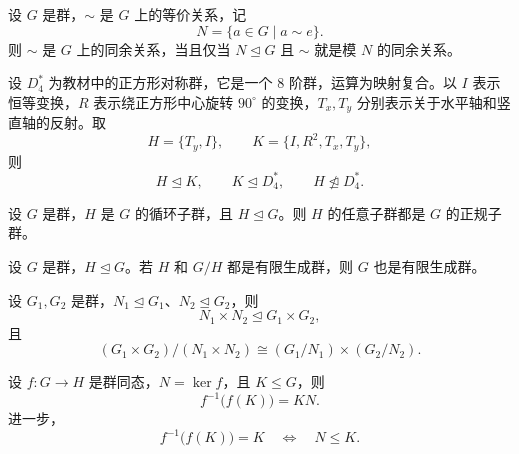 \begin{proposition}\label{prop:congruence-identity-class}
设 $G$ 是群，$\sim$ 是 $G$ 上的等价关系，记
\[
  N=\{a\in G\mid a\sim e\}.
\]
则 $\sim$ 是 $G$ 上的同余关系，当且仅当 $N\trianglelefteq G$ 且 $\sim$ 就是模 $N$ 的同余关系。
\end{proposition}

\begin{example}\label{ex:normality-not-transitive}
设 $D_4^*$ 为教材中的正方形对称群，它是一个 $8$ 阶群，运算为映射复合。以 $I$ 表示恒等变换，$R$ 表示绕正方形中心旋转 $90^\circ$ 的变换，$T_x,T_y$ 分别表示关于水平轴和竖直轴的反射。取
\[
  H=\{T_y,I\},\qquad K=\{I,R^2,T_x,T_y\},
\]
则
\[
  H\trianglelefteq K,\qquad K\trianglelefteq D_4^*,
  \qquad H\not\trianglelefteq D_4^*.
\]
\end{example}

\begin{proposition}\label{prop:subgroups-of-cyclic-normal}
设 $G$ 是群，$H$ 是 $G$ 的循环子群，且 $H\trianglelefteq G$。则 $H$ 的任意子群都是 $G$ 的正规子群。
\end{proposition}

\begin{theorem}\label{thm:finitely-generated-extension}
设 $G$ 是群，$H\trianglelefteq G$。若 $H$ 和 $G/H$ 都是有限生成群，则 $G$ 也是有限生成群。
\end{theorem}

\begin{proposition}\label{prop:quotient-direct-product}
设 $G_1,G_2$ 是群，$N_1\trianglelefteq G_1$、$N_2\trianglelefteq G_2$，则
\[
  N_1\times N_2\trianglelefteq G_1\times G_2,
\]
且
\[
  (G_1\times G_2)/(N_1\times N_2)
  \cong(G_1/N_1)\times(G_2/N_2).
\]
\end{proposition}

\begin{theorem}\label{thm:preimage-image-subgroup}
设 $f:G\to H$ 是群同态，$N=\ker f$，且 $K\leq G$，则
\[
  f^{-1}\bigl(f(K)\bigr)=KN.
\]
进一步，
\[
  f^{-1}\bigl(f(K)\bigr)=K\quad\Longleftrightarrow\quad N\leq K.
\]
\end{theorem}
